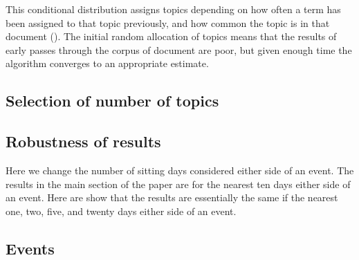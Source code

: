 \documentclass[12pt,]{article}
\theoremstyle{definition}
\theoremstyle{definition}
\theoremstyle{definition}
\theoremstyle{remark}
\begin{document}
This conditional distribution assigns topics depending on how often a
term has been assigned to that topic previously, and how common the
topic is in that document (\citet{SteyversGriffiths2006}). The initial
random allocation of topics means that the results of early passes
through the corpus of document are poor, but given enough time the
algorithm converges to an appropriate estimate.

\subsection{Selection of number of
topics}\label{selection-of-number-of-topics}

\subsection{Robustness of results}\label{robustness-of-results}

Here we change the number of sitting days considered either side of an
event. The results in the main section of the paper are for the nearest
ten days either side of an event. Here are show that the results are
essentially the same if the nearest one, two, five, and twenty days
either side of an event.

\subsection{Events}\label{events}
\end{document}
